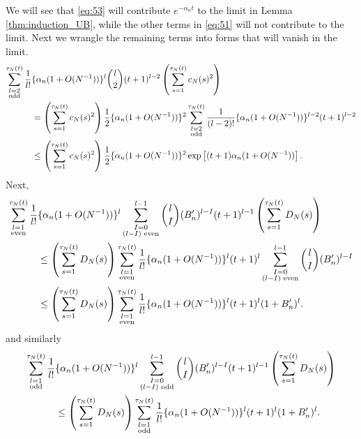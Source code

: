 \documentclass{article}
\newcommand{\1}[1]{\mathbbm{1}_{#1}}
\begin{document}
We will see that \eqref{eq:53} will contribute $e^{-\alpha_n t}$ to the limit in Lemma \ref{thm:induction_UB}, while the other terms in \eqref{eq:51} will not contribute to the limit.
Next we wrangle the remaining terms into forms that will vanish in the limit.
\begin{align}
\sum_{\substack{l=2\\ \text{odd}}}^{\tau_N(t)} \frac{1}{l!} &\{\alpha_n (1+O(N^{-1}))\}^l \binom{l}{2} (t+1)^{l-2} 
\left( \sum_{s=1}^{\tau_N(t)} c_N(s)^2 \right) \notag\\
&= \left( \sum_{s=1}^{\tau_N(t)} c_N(s)^2 \right) 
\frac{1}{2} \{\alpha_n (1+O(N^{-1}))\}^2
\sum_{\substack{l=2\\ \text{odd}}}^{\tau_N(t)} \frac{1}{(l-2)!} \{\alpha_n (1+O(N^{-1}))\}^{l-2} (t+1)^{l-2} \notag\\
&\leq \left( \sum_{s=1}^{\tau_N(t)} c_N(s)^2 \right) 
\frac{1}{2} \{\alpha_n (1+O(N^{-1}))\}^2
\exp\left[ (t+1) \alpha_n (1+O(N^{-1})) \right] . \label{eq:54}
\end{align}
Next,
\begin{align}
\sum_{\substack{l=1\\ \text{even}}}^{\tau_N(t)} \frac{1}{l!} &\{\alpha_n(1+O(N^{-1}))\}^l 
\sum_{\substack{I=0\\ (l-I)\text{ even} }}^{l-1} \binom{l}{I} (B_n^\prime)^{l-I} (t+1)^{l-1}
\left( \sum_{s=1}^{\tau_N(t)} D_N(s) \right) \notag\\
&\leq \left( \sum_{s=1}^{\tau_N(t)} D_N(s) \right)
\sum_{\substack{l=1\\ \text{even}}}^{\tau_N(t)} \frac{1}{l!} \{\alpha_n(1+O(N^{-1}))\}^l (t+1)^l
\sum_{\substack{I=0\\ (l-I)\text{ even} }}^{l-1} \binom{l}{I} (B_n^\prime)^{l-I} \notag\\
&\leq \left( \sum_{s=1}^{\tau_N(t)} D_N(s) \right)
\sum_{\substack{l=1\\ \text{even}}}^{\tau_N(t)} \frac{1}{l!} \{\alpha_n(1+O(N^{-1}))\}^l (t+1)^l
(1+B_n^\prime)^l . \label{eq:55}
\end{align}
and similarly
\begin{align}
\sum_{\substack{l=1\\ \text{odd}}}^{\tau_N(t)} \frac{1}{l!} &\{\alpha_n(1+O(N^{-1}))\}^l
\sum_{\substack{I=0\\ (l-I)\text{ odd}}}^{l-1} \binom{l}{I} (B_n^\prime)^{l-I} (t+1)^{l-1}
\left( \sum_{s=1}^{\tau_N(t)} D_N(s) \right) \notag\\
&\leq \left( \sum_{s=1}^{\tau_N(t)} D_N(s) \right)
\sum_{\substack{l=1\\ \text{odd}}}^{\tau_N(t)} \frac{1}{l!} \{\alpha_n(1+O(N^{-1}))\}^l (t+1)^l (1+B_n^\prime)^l . \label{eq:56}
\end{align}
\end{document}
